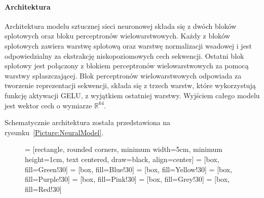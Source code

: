 \documentclass{article}
\begin{document}
{            \paragraph{Architektura}
                Architektura modelu sztucznej sieci neuronowej składa się z dwóch bloków splotowych oraz bloku perceptronów wielowarstwowych. Każdy z bloków splotowych zawiera warstwę splotową oraz warstwę normalizacji wsadowej i jest odpowiedzialny za ekstrakcję niskopoziomowych cech sekwencji. Ostatni blok splotowy jest połączony z blokiem perceptronów wielowarstwowych za pomocą warstwy spłaszczającej. Blok perceptronów wielowarstwowych odpowiada za tworzenie reprezentacji sekwencji, składa się z trzech warstw, które wykorzystują funkcję aktywacji GELU\cite{Hendrycks:2016}, z wyjątkiem ostatniej warstwy. Wyjściem całego modelu jest wektor cech o wymiarze $\mathbb{R}^{64}$.

                Schematycznie architektura została przedstawiona na rysunku~\ref{Picture:NeuralModel}.

                \begin{figure}[!htb]
                    \begin{center}
                        {

                         = [rectangle, rounded corners, minimum width=5cm, minimum height=1cm, text centered, draw=black, align=center]
                         = [box, fill=Green!30]
                         = [box, fill=Blue!30]
                         = [box, fill=Yellow!30]
                         = [box, fill=Purple!30]
                         = [box, fill=Pink!30]
                         = [box, fill=Grey!30]
                         = [box, fill=Red!30]

}
\end{center}
\end{figure}}
\end{document}
